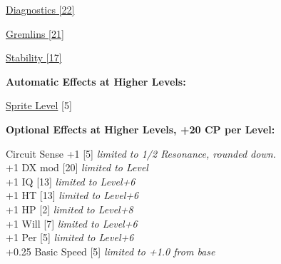 \begin{multicols*}{3}
\hyperref[diagnostics]{Diagnostics [22]}

\hyperref[gremlins]{Gremlins [21]}

\hyperref[stability]{Stability [17]}

\textbf{Automatic Effects at Higher Levels:}

\hyperref[sprite_level]{Sprite Level} [5]

\textbf{Optional Effects at Higher Levels, +20 CP per Level:}

Circuit Sense +1 [5] \textit{limited to 1/2 Resonance, rounded down.}\\
+1 DX mod [20] \textit{limited to Level}\\
+1 IQ [13] \textit{limited to Level+6}\\
+1 HT [13] \textit{limited to Level+6}\\
+1 HP [2] \textit{limited to Level+8}\\
+1 Will [7] \textit{limited to Level+6}\\
+1 Per [5] \textit{limited to Level+6}\\
+0.25 Basic Speed [5] \textit{limited to +1.0 from base}\\
	
\end{multicols*}
